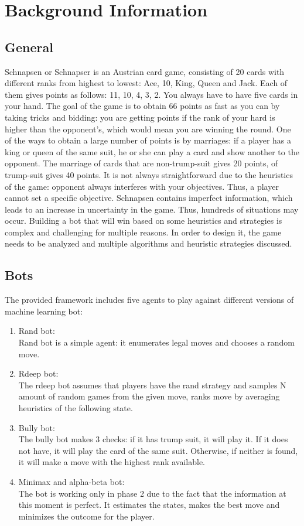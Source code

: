 \documentclass[master]{subfiles}
\begin{document}
\section{Background Information}
\subsection{General}
Schnapsen or Schnapser is an Austrian card game, consisting of 20 cards with different ranks from highest to lowest: Ace, 10, King, Queen and Jack. Each of them gives points as follows: 11, 10, 4, 3, 2. You always have to have five cards in your hand. The goal of the game is to obtain 66 points as fast as you can by taking tricks and bidding: you are getting points if the rank of your hard is higher than the opponent's, which would mean you are winning the round. One of the ways to obtain a large number of points is by marriages: if a player has a king or queen of the same suit, he or she can play a card and show another to the opponent. The marriage of cards that are non-trump-suit gives 20 points, of trump-suit gives 40 points. It is not always straightforward due to the heuristics of the game: opponent always interferes with your objectives. Thus, a player cannot set a specific objective. Schnapsen contains imperfect information, which leads to an increase in uncertainty in the game. Thus, hundreds of situations may occur. Building a bot that will win based on some heuristics and strategies is complex and challenging for multiple reasons. In order to design it, the game needs to be analyzed and multiple algorithms and heuristic strategies discussed.
\subsection{Bots}
The provided framework includes five agents to play against different versions of machine learning bot:
\begin{enumerate}
\item Rand bot: \\
Rand bot is a simple agent: it enumerates legal moves and chooses a random move.
\item Rdeep bot: \\
The rdeep bot assumes that players have the rand strategy and samples N amount of random games from the given move, ranks move by averaging heuristics of the following state.
\item Bully bot: \\
The bully bot makes 3 checks: if it has trump suit, it will play it. If it does not have, it will play the card of the same suit. Otherwise, if neither is found, it will make a move with the highest rank available.
\item Minimax and alpha-beta bot: \\
The bot is working only in phase 2 due to the fact that the information at this moment is perfect. It estimates the states, makes the best move and minimizes the outcome for the player. 
\end{enumerate}
\end{document}
